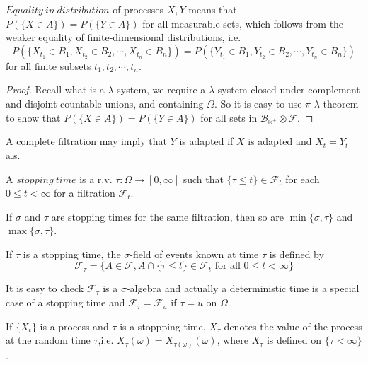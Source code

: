 \documentclass[lang=en, color=blue, ]{elegantbook}
\newcommand{\F}{\mathcal{F}}
\newcommand{\R}{\mathbb{R}}
\newcommand{\B}{\mathcal{B}}
\begin{document}
\begin{definition}
$Equality\ in\ distribution$ of processes $X,Y$ means that $P(\{X\in A\}) = P(\{Y\in A\})$ for all measurable sets, which follows from the weaker equality of finite-dimensional distributions, i.e.
\[P(\{X_{t_1}\in B_1,X_{t_2}\in B_2,\cdots,X_{t_n}\in B_n\}) = P(\{Y_{t_1}\in B_1,Y_{t_2}\in B_2,\cdots,Y_{t_n}\in B_n\})\]
for all finite subsets $t_1,t_2,\cdots,t_n$.
\end{definition}
\begin{proof}\par
Recall what is a $\lambda$-system, we require a $\lambda$-system closed under complement and disjoint countable unions, and containing $\Omega$. So it is easy to use $\pi$-$\lambda$ theorem to show that $P(\{X\in A\}) = P(\{Y\in A\})$ for all sets in $\B_{\R^+}\otimes \F$.
\end{proof}

\begin{proposition}
A complete filtration may imply that $Y$ is adapted if $X$ is adapted and $X_t = Y_t$ a.s.
\end{proposition}

\begin{definition}
A $stopping\ time$ is a r.v. $\tau:\Omega \to [0,\infty]$ such that $\{\tau \leq t\}\in \F_t$ for each $0\leq t <\infty$ for a filtration $\F_t$.
\end{definition}
\begin{proposition}
If $\sigma$ and $\tau$ are stopping times for the same filtration, then so are $\min\{\sigma,\tau\}$ and $\max\{\sigma,\tau\}$.
\end{proposition}

\begin{definition}
    If $\tau$ is a stopping time, the $\sigma$-field of events known at time $\tau$ is defined by
    \[\F_{\tau} = \{A\in\F,A\cap\{\tau\leq t\}\in \F_t\text{ for all }0\leq t < \infty\}\]
\end{definition}
It is easy to check $\F_{\tau}$ is a $\sigma$-algebra and actually a deterministic time is a special case of a stopping time and $\F_{\tau} = \F_u$ if $\tau = u$ on $\Omega$.

\begin{definition}
    If $\{X_t\}$ is a process and $\tau$ is a stoppping time, $X_{\tau}$ denotes the value of the process at the random time $\tau$,i.e. $X_{\tau}(\omega) = X_{\tau(\omega)}(\omega)$, where $X_{\tau}$ is defined on $\{\tau<\infty\}$. 
\end{definition}
\end{document}
